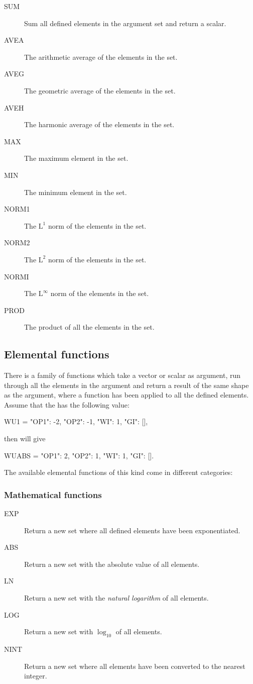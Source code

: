 \begin{description}
\item[SUM] Sum all defined elements in the argument set and return a scalar.
\item[AVEA] The arithmetic average of the elements in the set.
\item[AVEG] The geometric average of the elements in the set.
\item[AVEH] The harmonic average of the elements in the set.
\item[MAX] The maximum element in the set.
\item[MIN] The minimum element in the set.
\item[NORM1] The $\mathrm{L^1}$ norm of the elements in the set.
\item[NORM2] The $\mathrm{L^2}$ norm of the elements in the set.
\item[NORMI] The $\mathrm{L^\infty}$ norm of the elements in the set.
\item[PROD] The product of all the elements in the set.
\end{description}


\subsection{Elemental functions}
There is a family of functions which take a vector or scalar as argument, run
through  all the elements in the argument and return a result of the same shape
as the argument, where a function has been applied to all the defined elements.
Assume that the  has the following value:

\begin{code}
  WU1 = {"OP1": -2, "OP2": -1, "WI": 1, "GI": []},
\end{code}

then  will give

\begin{code}
  WUABS = {"OP1": 2, "OP2": 1, "WI": 1, "GI": []}.
\end{code}

The available elemental functions of this kind come in different categories:

\subsubsection*{Mathematical functions}
\begin{description}
\item[EXP] Return a new set where all defined elements have been exponentiated.
\item[ABS] Return a new set with the absolute value of all elements.
\item[LN] Return a new set with the \emph{natural logarithm} of all elements.
\item[LOG] Return a new set with $\log_{10}$ of all elements.
\item[NINT] Return a new set where all elements have been converted to the
  nearest integer.
\end{description}

